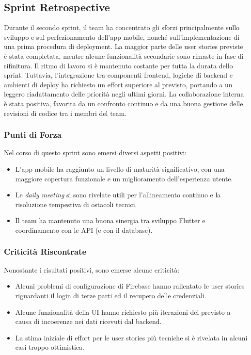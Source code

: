 \subsection{Sprint Retrospective}
Durante il secondo sprint, il team ha concentrato gli sforzi principalmente sullo sviluppo e sul perfezionamento dell’app mobile, nonché sull’implementazione di una prima procedura di deployment. La maggior parte delle user stories previste è stata completata, mentre alcune funzionalità secondarie sono rimaste in fase di rifinitura.
Il ritmo di lavoro si è mantenuto costante per tutta la durata dello sprint. Tuttavia, l’integrazione tra componenti frontend, logiche di backend e ambienti di deploy ha richiesto un effort superiore al previsto, portando a un leggero riadattamento delle priorità negli ultimi giorni.
La collaborazione interna è stata positiva, favorita da un confronto continuo e da una buona gestione delle revisioni di codice tra i membri del team.

\subsubsection{Punti di Forza}
Nel corso di questo sprint sono emersi diversi aspetti positivi:
\begin{itemize}
    \item L’app mobile ha raggiunto un livello di maturità significativo, con una maggiore copertura funzionale e un miglioramento dell’esperienza utente.
    \item Le \textit{daily meeting} si sono rivelate utili per l’allineamento continuo e la risoluzione tempestiva di ostacoli tecnici.
    \item Il team ha mantenuto una buona sinergia tra sviluppo Flutter e coordinamento con le API (e con il database).
\end{itemize}

\subsubsection{Criticità Riscontrate}
Nonostante i risultati positivi, sono emerse alcune criticità:
\begin{itemize}
    \item Alcuni problemi di configurazione di Firebase hanno rallentato le user stories riguardanti il login di terze parti ed il recupero delle credenziali.
    \item Alcune funzionalità della UI hanno richiesto più iterazioni del previsto a causa di incoerenze nei dati ricevuti dal backend.
    \item La stima iniziale di effort per le user stories più tecniche si è rivelata in alcuni casi troppo ottimistica.
\end{itemize}

